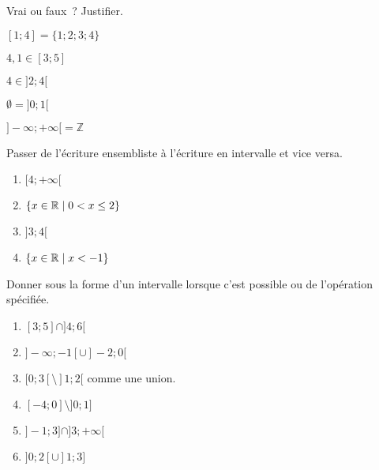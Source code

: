 \documentclass[a4paper,12pt]{article}
\begin{document}
\begin{activite}
	\tcblower
	\begin{tasks}
		\task 	Vrai ou faux~? Justifier.

	\begin{inlineumerate}
	\item $[1;4]=\{1;2;3;4\}$\hspace{1cm}
\item $4,1\in [3;5]$\hspace{0.7cm}
\item $4\in ]2;4[$\hspace{0.7cm}
\item $\emptyset=]0;1[$\hspace{0.7cm}
\item $]-\infty;+\infty[=\mathbb{Z}$
\end{inlineumerate}
	\task Passer de l'écriture ensembliste à l'écriture en intervalle et vice versa. 
	\begin{multicols}{2}
	\begin{enumerate}
		\item $[4;+\infty[$
		\item $\{x\in \mathbb{R} \; |\; 0<x\leq 2\}$
		\item $]3;4[$	
		\item $\{x\in \mathbb{R}\;|\; x<-1\}$
	\end{enumerate}
	\end{multicols}
	\task Donner sous la forme d'un intervalle lorsque c'est possible ou de l'opération spécifiée.
	\begin{multicols}{2}
		\begin{enumerate}
			\item $[3;5]\cap ]4;6[$
			\item $]-\infty;-1[\cup ]-2;0[$
			\item $[0;3[\setminus ]1;2[$ comme une union. 
			\item $[-4;0]\setminus]0;1]$
			\item $]-1;3]\cap]3;+\infty[$
			\item $]0;2[\cup]1;3]$
		\end{enumerate}
	\end{multicols}
	\end{tasks}
\end{activite}
\end{document}
